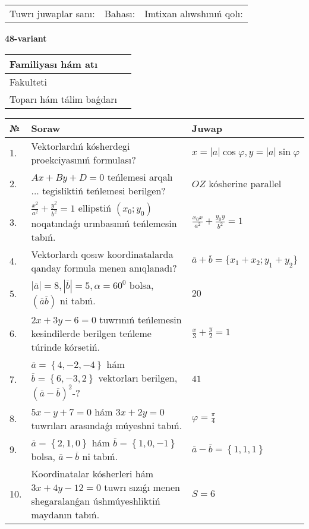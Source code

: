 \documentclass{article}
\begin{document}
\vspace{1cm}

\begin{tabular}{lll}
Tuwrı juwaplar sanı: \underline{\hspace{1.5cm}} & 
Bahası: \underline{\hspace{1.5cm}} & 
Imtixan alıwshınıń qolı: \underline{\hspace{2cm}} \\
\end{tabular}

\egroup

\newpage


\textbf{48-variant}\\

\bgroup
\def\arraystretch{1.6} %

\begin{tabular}{|m{5.7cm}|m{9.5cm}|}
\hline
Familiyası hám atı & \\
\hline
Fakulteti  & \\
\hline
Toparı hám tálim baǵdarı  & \\
\hline
\end{tabular}

\vspace{1cm}

\begin{tabular}{|m{0.7cm}|m{10cm}|m{4cm}|}
\hline
№ & Soraw & Juwap \\
\hline
1. & Vektorlardıń kósherdegi proekciyasınıń formulası? & $x=|a|\cos\varphi, y=|a|\sin\varphi$ \\
\hline
2. & $Ax+By+D=0$ teńlemesi arqalı ... tegisliktiń teńlemesi berilgen? & $OZ$ kósherine parallel \\
\hline
3. & $\frac{x^2}{a^2}+\frac{y^2}{b^2}=1$ ellipstiń $(x_0;y_0)$ noqatındaǵı urınbasınıń teńlemesin tabıń. & $\frac{x_0x}{a^2}+\frac{y_0y}{b^2}=1$ \\
\hline
4. & Vektorlardı qosıw koordinatalarda qanday formula menen anıqlanadı? & $\overline{a}+\overline{b}=\{x_1+x_2;y_1+y_2\}$ \\
\hline
5. & $\left| \overline{a} \right|=8, \left| \overline{b} \right|=5, \alpha=60^{0}$ bolsa, $( \overline{a}\overline{b} )$ ni tabıń. & $20$ \\
\hline
6. & $2x+3y-6=0$ tuwrınıń teńlemesin kesindilerde berilgen teńleme túrinde kórsetiń. & $\frac{x}{3} + \frac{ y }{ 2 } =  1$ \\
\hline
7. & $\overline{a}=\left\{ 4,-2,-4 \right\}$ hám $\overline{b}=\left\{ 6,-3, 2 \right\}$ vektorları berilgen, $(\overline{a}-\overline{b}) ^{2}$-? & $41$ \\
\hline
8. & $5x-y+7=0$ hám $3x+2y=0$ tuwrıları arasındaǵı múyeshni tabıń. & $\varphi=\frac{\pi}{4}$ \\
\hline
9. & $\overline{a}=\left\{ 2, 1, 0 \right\}$ hám $\overline{b}=\left\{ 1, 0,-1 \right\}$ bolsa, $\overline{a}-\overline{b}$ ni tabıń. & $\overline{a} -\overline{b} = \left\{ 1,1,1 \right\}$ \\
\hline
10. & Koordinatalar kósherleri hám $ 3x+4y-12=0 $ tuwrı sızıǵı menen shegaralanǵan úshmúyeshliktiń maydanın tabıń. & $ S=6 $ \\
\hline
\end{tabular}
\end{document}
